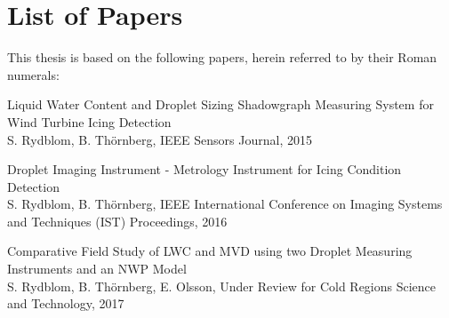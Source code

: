 

\thispagestyle{plain}

\chapter*{List of Papers}
\vspace{20pt}

\noindent This thesis is based on the following papers, herein referred to by their Roman numerals:  

\newcommand{\paperone}{Liquid Water Content and Droplet Sizing Shadowgraph Measuring System for Wind Turbine Icing Detection}
\newcommand{\papertwo}{Droplet Imaging Instrument - Metrology Instrument for Icing Condition Detection}
\newcommand{\paperthree}{Comparative Field Study of LWC and MVD using two Droplet Measuring Instruments and an NWP Model}

\newcommand{\authorone}{S. Rydblom, B. Thörnberg}
\newcommand{\authortwo}{S. Rydblom, B. Thörnberg, E. Olsson}


\newcommand{\ieeesens}{IEEE Sensors Journal}
\newcommand{\ieeeconf}{IEEE International Conference on Imaging Systems and Techniques (IST) Proceedings}
\newcommand{\mst}{Measurement Science and Technology}
\newcommand{\coldreg}{Under Review for Cold Regions Science and Technology}

\begin{description}[style=nextline]
    \item[Paper I]
    \paperone \\ 
    \authorone, \ieeesens, 2015\dotfill \pageref{pap:paper1}
    
    \item[Paper II]
    \papertwo \\ 
    \authorone, \ieeeconf, 2016\dotfill \pageref{pap:paper2}
     
    \item[Paper III]
    \paperthree \\ 
    \authortwo, \coldreg, 2017\dotfill \pageref{pap:paper3}

%    
%   
%



\end{description}

